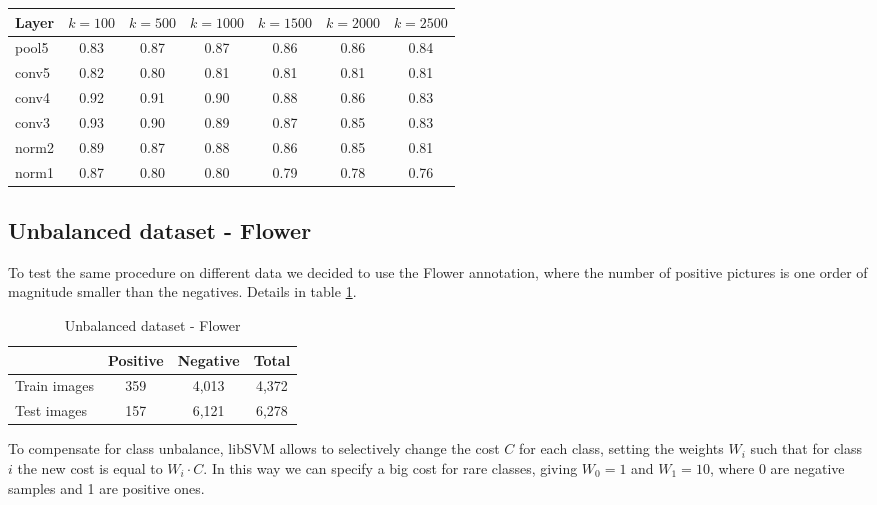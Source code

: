 \begin{table*}[t!]
\caption{Average precision on Adult - Polynomial degree 3}
\centering
\begin{tabular}{lcccccc}
    Layer       & $k=100$ & $k=500$ & $k=1000$ & $k=1500$ &
    $k=2000$ & $k=2500$ \\
    \midrule
    pool5        & 0.83 & 0.87 & 0.87 & 0.86 & 0.86 & 0.84 \\
    conv5        & 0.82 & 0.80 & 0.81 & 0.81 & 0.81 & 0.81 \\
    conv4        & 0.92 & 0.91 & 0.90 & 0.88 & 0.86 & 0.83 \\
    conv3        & 0.93 & 0.90 & 0.89 & 0.87 & 0.85 & 0.83 \\
    norm2        & 0.89 & 0.87 & 0.88 & 0.86 & 0.85 & 0.81 \\
    norm1        & 0.87 & 0.80 & 0.80 & 0.79 & 0.78 & 0.76 \\
\end{tabular}
\label{table:meas2}
\end{table*}

\subsection{Unbalanced dataset - Flower}

To test the same procedure on different data we decided to use the Flower
annotation, where the number of positive pictures is one order of magnitude
smaller than the negatives. Details in table \ref{table:ds2}.

\begin{table}[htbp]
\caption{Unbalanced dataset - Flower}
\centering
\begin{tabular}{l|cc|c}
       ~            & Positive & Negative & Total  \\
    \midrule                                     
    Train images    & 359   & 4,013       & 4,372  \\
    Test images     & 157   & 6,121       & 6,278  \\
\end{tabular}
\label{table:ds2}
\end{table}

To compensate for class unbalance, libSVM allows to selectively change the cost
$C$ for each class, setting the weights $W_i$ such that for class $i$ the
new cost is equal to $W_i \cdot C$. In this way we can specify a big cost for
rare classes, giving $W_0 = 1$ and $W_1 = 10$, where 0 are negative samples and
1 are positive ones.

